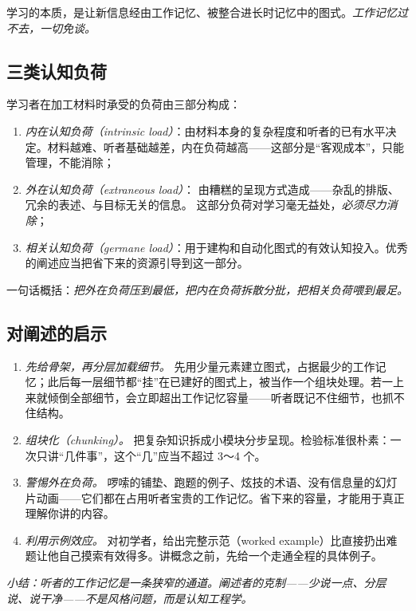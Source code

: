 学习的本质，是让新信息经由工作记忆、被整合进长时记忆中的图式。\textit{工作记忆过不去，一切免谈。}

\subsection{三类认知负荷}

学习者在加工材料时承受的负荷由三部分构成：
\begin{enumerate}[label=\arabic*.]
    \item \textit{内在认知负荷（intrinsic load）}：由材料本身的复杂程度和听者的已有水平决定。材料越难、听者基础越差，内在负荷越高——这部分是“客观成本”，只能管理，不能消除；
    \item \textit{外在认知负荷（extraneous load）}： 由糟糕的呈现方式造成——杂乱的排版、冗余的表述、与目标无关的信息。 这部分负荷对学习毫无益处，\textit{必须尽力消除}；
    \item \textit{相关认知负荷（germane load）}：用于建构和自动化图式的有效认知投入。优秀的阐述应当把省下来的资源引导到这一部分。
\end{enumerate}

一句话概括：\textit{把外在负荷压到最低，把内在负荷拆散分批，把相关负荷喂到最足。}

\subsection{对阐述的启示}
\begin{enumerate}[label=\arabic*.]
    \item \textit{先给骨架，再分层加载细节。} 先用少量元素建立图式，占据最少的工作记忆；此后每一层细节都“挂”在已建好的图式上，被当作一个组块处理。若一上来就倾倒全部细节，会立即超出工作记忆容量——听者既记不住细节，也抓不住结构。
    \item \textit{组块化（chunking）。} 把复杂知识拆成小模块分步呈现。检验标准很朴素：一次只讲“几件事”，这个“几”应当不超过 3～4 个。
    \item \textit{警惕外在负荷。} 啰嗦的铺垫、跑题的例子、炫技的术语、没有信息量的幻灯片动画——它们都在占用听者宝贵的工作记忆。省下来的容量，才能用于真正理解你讲的内容。
    \item \textit{利用示例效应。} 对初学者，给出完整示范（worked example）比直接扔出难题让他自己摸索有效得多。讲概念之前，先给一个走通全程的具体例子。
\end{enumerate}

\nid\textit{小结：听者的工作记忆是一条狭窄的通道。阐述者的克制——少说一点、分层说、说干净——不是风格问题，而是认知工程学。}

